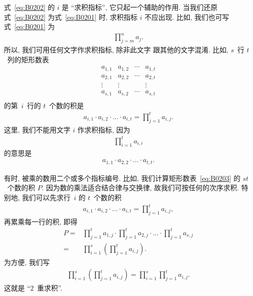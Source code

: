 式~\eqref{eq:B0202} 的 \(i\) 是 ``求积指标'',
它只起一个辅助的作用.
当我们还原式~\eqref{eq:B0202}
为式~\eqref{eq:B0201} 时,
求积指标 \(i\) 不应出现.
比如, 我们也可写式~\eqref{eq:B0201} 为
\begin{align*}
    \prod_{j = m}^{n} {a_j}.
\end{align*}
所以, 我们可用任何文字作求积指标, 除非此文字%
跟其他的文字混淆.
比如, \(s\)~行 \(t\)~列的矩形数表
\begin{equation}
    \begin{matrix}
        a_{1,1} & a_{1,2} & \cdots & a_{1,t} \\
        a_{2,1} & a_{2,2} & \cdots & a_{2,t} \\
        \vdots  & \vdots  & {}     & \vdots  \\
        a_{s,1} & a_{s,2} & \cdots & a_{s,t} \\
    \end{matrix}
    \label{eq:B0203}
\end{equation}
的第~\(i\)~行的 \(t\)~个数的积是
\begin{align*}
    a_{i,1} \cdot a_{i,2} \cdot \dots \cdot a_{i,t}
    = \prod_{j = 1}^{t} {a_{i,j}}.
\end{align*}
这里, 我们不能用文字 \(i\) 作求积指标,
因为
\begin{align*}
    \prod_{i = 1}^{t} {a_{i,i}}
\end{align*}
的意思是
\begin{align*}
    a_{1,1} \cdot a_{2,2} \cdot \dots \cdot a_{t,t}.
\end{align*}

有时, 被乘的数用二个或多个指标编号.
比如, 我们计算矩形数表~\eqref{eq:B0203} 的 \(st\)~个数的积 \(P\).
因为数的乘法适合结合律与交换律,
故我们可按任何的次序求积.
特别地, 我们可以先求行~\(i\) 的 \(t\)~个数的积
\begin{align*}
    a_{i,1} \cdot a_{i,2} \cdot \dots \cdot a_{i,t}
    = \prod_{j = 1}^{t} {a_{i,j}},
\end{align*}
再累乘每一行的积, 即得
\begin{align*}
    P
    = {} & \prod_{j = 1}^{t} {a_{1,j}}
    \cdot \prod_{j = 1}^{t} {a_{2,j}}
    \cdot \dots
    \cdot \prod_{j = 1}^{t} {a_{s,j}}
    \\
    = {} &
    \prod_{i = 1}^{s}
    {\left( \prod_{j = 1}^{t} {a_{i,j}} \right)}.
\end{align*}
为方便, 我们写
\begin{align*}
    \prod_{i = 1}^{s}
    {\left( \prod_{j = 1}^{t} {a_{i,j}} \right)}
    = \prod_{i = 1}^{s}
    {\prod_{j = 1}^{t} {a_{i,j}}}.
\end{align*}
这就是 ``\(2\)~重求积''.

